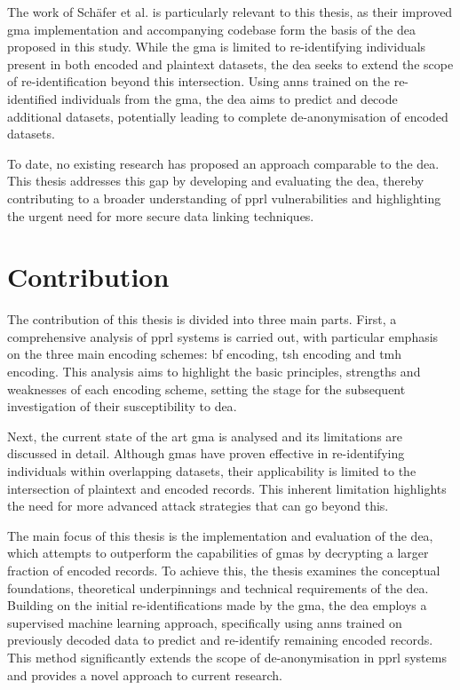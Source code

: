 The work of Schäfer et al. \cite{schaefer2024} is particularly relevant to this thesis, as their improved \ac{gma} implementation and accompanying codebase form the basis of the \ac{dea} proposed in this study.
While the \ac{gma} is limited to re-identifying individuals present in both encoded and plaintext datasets, the \ac{dea} seeks to extend the scope of re-identification beyond this intersection.
Using \ac{ann}s trained on the re-identified individuals from the \ac{gma}, the \ac{dea} aims to predict and decode additional datasets, potentially leading to complete de-anonymisation of encoded datasets.

To date, no existing research has proposed an approach comparable to the \ac{dea}.
This thesis addresses this gap by developing and evaluating the \ac{dea}, thereby contributing to a broader understanding of \ac{pprl} vulnerabilities and highlighting the urgent need for more secure data linking techniques.

\section{Contribution}  \label{sec:contribution}

The contribution of this thesis is divided into three main parts.
First, a comprehensive analysis of \ac{pprl} systems is carried out, with particular emphasis on the three main encoding schemes: \ac{bf} encoding, \ac{tsh} encoding and \ac{tmh} encoding.
This analysis aims to highlight the basic principles, strengths and weaknesses of each encoding scheme, setting the stage for the subsequent investigation of their susceptibility to \ac{dea}.

Next, the current state of the art \ac{gma} is analysed and its limitations are discussed in detail.
Although \ac{gma}s have proven effective in re-identifying individuals within overlapping datasets, their applicability is limited to the intersection of plaintext and encoded records.
This inherent limitation highlights the need for more advanced attack strategies that can go beyond this.

The main focus of this thesis is the implementation and evaluation of the \ac{dea}, which attempts to outperform the capabilities of \ac{gma}s by decrypting a larger fraction of encoded records.
To achieve this, the thesis examines the conceptual foundations, theoretical underpinnings and technical requirements of the \ac{dea}.
Building on the initial re-identifications made by the \ac{gma}, the \ac{dea} employs a supervised machine learning approach, specifically using \ac{ann}s trained on previously decoded data to predict and re-identify remaining encoded records.
This method significantly extends the scope of de-anonymisation in \ac{pprl} systems and provides a novel approach to current research.

